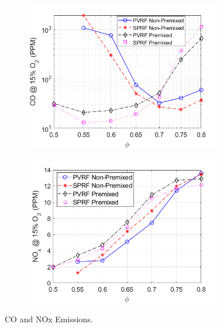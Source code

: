\begin{figure}[h!]
    \begin{subfigure}[t]{0.5\textwidth}
        \centering
	\includegraphics[width=0.95\textwidth]{Chapter5/Images/Experimental/Emissions/CO Emission.png}
	\label{Co Emissions}
    \end{subfigure}
    \begin{subfigure}[t]{0.5\textwidth}
        \centering
	\includegraphics[width=0.95\textwidth]{Chapter5/Images/Experimental/Emissions/NoxEmmision.png}
	\label{Nox Emissions}
    \end{subfigure}
\caption{CO and NOx Emissions.}
\label{fig:pollutantEmissions}
\end{figure}

